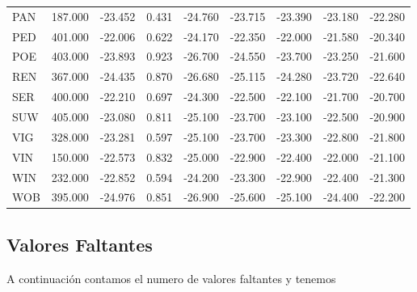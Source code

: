 \documentclass[a4paper,11pt]{article}
\begin{document}
\begin{table}[ht]
\begin{tabular}{|l|c|c|c|c|c|c|c|c|}
        PAN  & 187.000 & -23.452 & 0.431 & -24.760 & -23.715 & -23.390 & -23.180 & -22.280 \\
        PED  & 401.000 & -22.006 & 0.622 & -24.170 & -22.350 & -22.000 & -21.580 & -20.340 \\
        POE  & 403.000 & -23.893 & 0.923 & -26.700 & -24.550 & -23.700 & -23.250 & -21.600 \\
        REN  & 367.000 & -24.435 & 0.870 & -26.680 & -25.115 & -24.280 & -23.720 & -22.640 \\
        SER & 400.000 & -22.210 & 0.697 & -24.300 & -22.500 & -22.100 & -21.700 & -20.700 \\
        SUW  & 405.000 & -23.080 & 0.811 & -25.100 & -23.700 & -23.100 & -22.500 & -20.900 \\
        VIG  & 328.000 & -23.281 & 0.597 & -25.100 & -23.700 & -23.300 & -22.800 & -21.800 \\
        VIN  & 150.000 & -22.573 & 0.832 & -25.000 & -22.900 & -22.400 & -22.000 & -21.100 \\
        WIN & 232.000 & -22.852 & 0.594 & -24.200 & -23.300 & -22.900 & -22.400 & -21.300 \\
        WOB  & 395.000 & -24.976 & 0.851 & -26.900 & -25.600 & -25.100 & -24.400 & -22.200 \\
        \hline
    \end{tabular}
\end{table}

\newpage

\subsection*{Valores Faltantes}

A continuación contamos el numero de valores faltantes y tenemos
\end{document}
